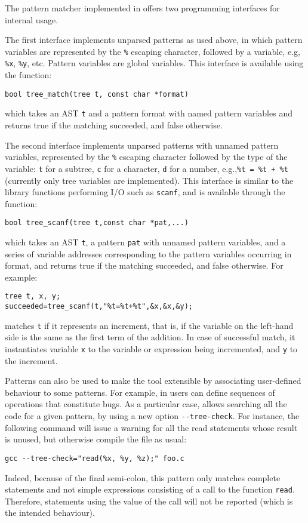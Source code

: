 The pattern matcher implemented in \MyGCC offers two programming
interfaces for internal usage.

The first interface implements unparsed patterns as used above, in
which pattern variables are represented by the \texttt{\%} escaping
character, followed by a variable, e.g, \texttt{\%x}, \texttt{\%y},
etc. Pattern variables are global variables. This interface is
available using the \Clang function:
\begin{verbatim}
bool tree_match(tree t, const char *format)
\end{verbatim}
which takes an AST \texttt{t} and a pattern format with named
pattern variables and returns true if the matching succeeded, and
false otherwise. 

The second interface implements unparsed patterns with unnamed pattern
variables, represented by the \texttt{\%} escaping character followed
by the type of the variable: \texttt{t} for a subtree, \texttt{c} for
a character, \texttt{d} for a number, e.g.,\texttt{\%t = \%t + \%t}
(currently only tree variables are implemented). This interface is
similar to the \Clang library functions performing I/O such as
\texttt{scanf}, and is available through the \Clang function:
\begin{verbatim}
bool tree_scanf(tree t,const char *pat,...)
\end{verbatim}
which takes an AST \texttt{t}, a pattern \texttt{pat} with unnamed
pattern variables, and a series of variable addresses corresponding to
the pattern variables occurring in format, and returns true if the
matching succeeded, and false otherwise. For example:
\begin{verbatim}
tree t, x, y;
succeeded=tree_scanf(t,"%t=%t+%t",&x,&x,&y);
\end{verbatim}
matches \texttt{t} if it represents an increment, that is, if the
variable on the left\hyp{}hand side is the same as the first term of
the addition. In case of successful match, it instantiates variable
\texttt{x} to the variable or expression being incremented, and
\texttt{y} to the increment.

Patterns can also be used to make the tool extensible by associating
user\hyp{}defined behaviour to some patterns. For example, in \MyGCC
users can define sequences of operations that constitute bugs. As a
particular case, \MyGCC allows searching all the code for a given
pattern, by using a new option \verb|--tree-check|. For instance, the
following command will issue a warning for all the read statements
whose result is unused, but otherwise compile the file as usual:
\begin{verbatim}
gcc --tree-check="read(%x, %y, %z);" foo.c   
\end{verbatim}
Indeed, because of the final semi\hyp{}colon, this pattern only
matches complete statements and not simple expressions consisting of a
call to the function \texttt{read}. Therefore, statements using the
value of the call will not be reported (which is the intended
behaviour).
